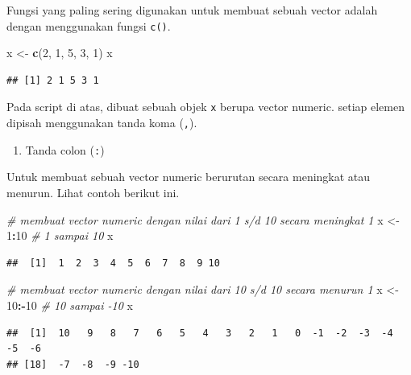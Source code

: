 \documentclass[]{book}
\newenvironment{Shaded}{\begin{snugshade}}{\end{snugshade}}
\newcommand{\CommentTok}[1]{\textcolor[rgb]{0.56,0.35,0.01}{\textit{#1}}}
\newcommand{\DecValTok}[1]{\textcolor[rgb]{0.00,0.00,0.81}{#1}}
\newcommand{\KeywordTok}[1]{\textcolor[rgb]{0.13,0.29,0.53}{\textbf{#1}}}
\newcommand{\NormalTok}[1]{#1}
\newcommand{\OperatorTok}[1]{\textcolor[rgb]{0.81,0.36,0.00}{\textbf{#1}}}
\newcommand{\StringTok}[1]{\textcolor[rgb]{0.31,0.60,0.02}{#1}}
\providecommand{\tightlist}{%
  \setlength{\itemsep}{0pt}\setlength{\parskip}{0pt}}
\begin{document}
Fungsi yang paling sering digunakan untuk membuat sebuah vector adalah dengan menggunakan fungsi \texttt{c()}.

\begin{Shaded}
\begin{Highlighting}[]
\NormalTok{x <-}\StringTok{ }\KeywordTok{c}\NormalTok{(}\DecValTok{2}\NormalTok{, }\DecValTok{1}\NormalTok{, }\DecValTok{5}\NormalTok{, }\DecValTok{3}\NormalTok{, }\DecValTok{1}\NormalTok{)}
\NormalTok{x}
\end{Highlighting}
\end{Shaded}

\begin{verbatim}
## [1] 2 1 5 3 1
\end{verbatim}

Pada script di atas, dibuat sebuah objek \texttt{x} berupa vector numeric. setiap elemen dipisah menggunakan tanda koma (\texttt{,}).

\begin{enumerate}
\def\labelenumi{\arabic{enumi}.}
\setcounter{enumi}{1}
\tightlist
\item
  Tanda colon (\texttt{:})
\end{enumerate}

Untuk membuat sebuah vector numeric berurutan secara meningkat atau menurun. Lihat contoh berikut ini.

\begin{Shaded}
\begin{Highlighting}[]
\CommentTok{# membuat vector numeric dengan nilai dari 1 s/d 10 secara meningkat 1}
\NormalTok{x <-}\StringTok{ }\DecValTok{1}\OperatorTok{:}\DecValTok{10} \CommentTok{# 1 sampai 10}
\NormalTok{x}
\end{Highlighting}
\end{Shaded}

\begin{verbatim}
##  [1]  1  2  3  4  5  6  7  8  9 10
\end{verbatim}

\begin{Shaded}
\begin{Highlighting}[]
\CommentTok{# membuat vector numeric dengan nilai dari 10 s/d 10 secara menurun 1}
\NormalTok{x <-}\StringTok{ }\DecValTok{10}\OperatorTok{:-}\DecValTok{10} \CommentTok{# 10 sampai -10}
\NormalTok{x}
\end{Highlighting}
\end{Shaded}

\begin{verbatim}
##  [1]  10   9   8   7   6   5   4   3   2   1   0  -1  -2  -3  -4  -5  -6
## [18]  -7  -8  -9 -10
\end{verbatim}
\end{document}
